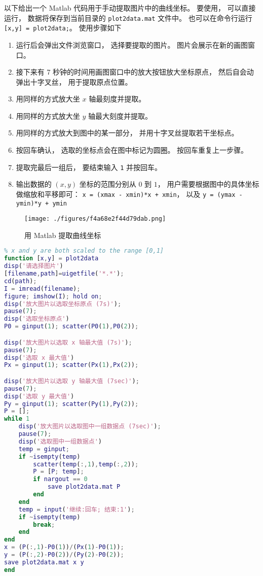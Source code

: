 

以下给出一个 Matlab 代码用于手动提取图片中的曲线坐标。 要使用， 可以直接运行， 数据将保存到当前目录的 \verb|plot2data.mat| 文件中。 也可以在命令行运行 \verb|[x,y] = plot2data;|。 使用步骤如下

\begin{enumerate}
\item 运行后会弹出文件浏览窗口， 选择要提取的图片。 图片会展示在新的画图窗口。
\item 接下来有 7 秒钟的时间用画图窗口中的放大按钮放大坐标原点， 然后自会动弹出十字叉丝， 用于提取原点位置。
\item 用同样的方式放大坐 $x$ 轴最刻度并提取。
\item 用同样的方式放大坐 $y$ 轴最大刻度并提取。
\item 用同样的方式放大到图中的某一部分， 并用十字叉丝提取若干坐标点。
\item 按回车确认， 选取的坐标点会在图中标记为圆圈。 按回车重复上一步骤。
\item 提取完最后一组后， 要结束输入 \verb|1| 并按回车。
\item 输出数据的 $(x, y)$ 坐标的范围分别从 $0$ 到 $1$， 用户需要根据图中的具体坐标做缩放和平移即可： \verb|x = (xmax - xmin)*x + xmin|， 以及 \verb|y = (ymax - ymin)*y + ymin|
\end{enumerate}

\begin{figure}[ht]
\centering
\texttt{[image: ./figures/f4a68e2f44d79dab.png]}
\caption{用 Matlab 提取曲线坐标} \label{fig_plt2xy_1}
\end{figure}

\begin{lstlisting}[language=matlab, caption=plot2data.m]
% Data Extractor for Plot
% x and y are both scaled to the range [0,1]
function [x,y] = plot2data
disp('请选择图片')
[filename,path]=uigetfile('*.*');
cd(path);
I = imread(filename);
figure; imshow(I); hold on;
disp('放大图片以选取坐标原点 (7s)');
pause(7);
disp('选取坐标原点')
P0 = ginput(1); scatter(P0(1),P0(2));

disp('放大图片以选取 x 轴最大值 (7s)');
pause(7);
disp('选取 x 最大值')
Px = ginput(1); scatter(Px(1),Px(2));

disp('放大图片以选取 y 轴最大值 (7sec)');
pause(7);
disp('选取 y 最大值')
Py = ginput(1); scatter(Py(1),Py(2));
P = [];
while 1
    disp('放大图片以选取图中一组数据点 (7sec)');
    pause(7);
    disp('选取图中一组数据点')
    temp = ginput;
    if ~isempty(temp)
        scatter(temp(:,1),temp(:,2));
        P = [P; temp];
        if nargout == 0
            save plot2data.mat P
        end
    end
    temp = input('继续:回车; 结束:1');
    if ~isempty(temp)
        break;
    end
end
x = (P(:,1)-P0(1))/(Px(1)-P0(1));
y = (P(:,2)-P0(2))/(Py(2)-P0(2));
save plot2data.mat x y
end
\end{lstlisting}
